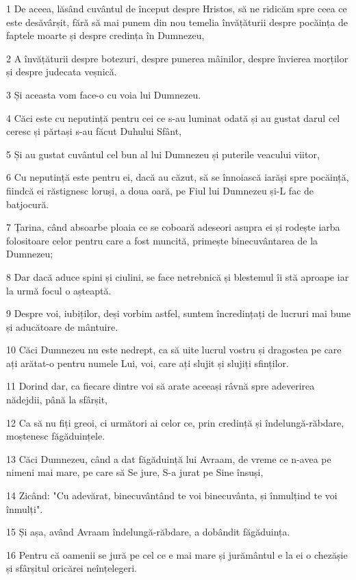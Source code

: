 \par 1 De aceea, lăsând cuvântul de început despre Hristos, să ne ridicăm spre ceea ce este desăvârșit, fără să mai punem din nou temelia învățăturii despre pocăința de faptele moarte și despre credința în Dumnezeu,
\par 2 A învățăturii despre botezuri, despre punerea mâinilor, despre învierea morților și despre judecata veșnică.
\par 3 Și aceasta vom face-o cu voia lui Dumnezeu.
\par 4 Căci este cu neputință pentru cei ce s-au luminat odată și au gustat darul cel ceresc și părtași s-au făcut Duhului Sfânt,
\par 5 Și au gustat cuvântul cel bun al lui Dumnezeu și puterile veacului viitor,
\par 6 Cu neputință este pentru ei, dacă au căzut, să se înnoiască iarăși spre pocăință, fiindcă ei răstignesc loruși, a doua oară, pe Fiul lui Dumnezeu și-L fac de batjocură.
\par 7 Țarina, când absoarbe ploaia ce se coboară adeseori asupra ei și rodește iarba folositoare celor pentru care a fost muncită, primește binecuvântarea de la Dumnezeu;
\par 8 Dar dacă aduce spini și ciulini, se face netrebnică și blestemul îi stă aproape iar la urmă focul o așteaptă.
\par 9 Despre voi, iubiților, deși vorbim astfel, suntem încredințați de lucruri mai bune și aducătoare de mântuire.
\par 10 Căci Dumnezeu nu este nedrept, ca să uite lucrul vostru și dragostea pe care ați arătat-o pentru numele Lui, voi, care ați slujit și slujiți sfinților.
\par 11 Dorind dar, ca fiecare dintre voi să arate aceeași râvnă spre adeverirea nădejdii, până la sfârșit,
\par 12 Ca să nu fiți greoi, ci următori ai celor ce, prin credință și îndelungă-răbdare, moștenesc făgăduințele.
\par 13 Căci Dumnezeu, când a dat făgăduință lui Avraam, de vreme ce n-avea pe nimeni mai mare, pe care să Se jure, S-a jurat pe Sine însuși,
\par 14 Zicând: "Cu adevărat, binecuvântând te voi binecuvânta, și înmulțind te voi înmulți".
\par 15 Și așa, având Avraam îndelungă-răbdare, a dobândit făgăduința.
\par 16 Pentru că oamenii se jură pe cel ce e mai mare și jurământul e la ei o chezășie și sfârșitul oricărei neînțelegeri.
